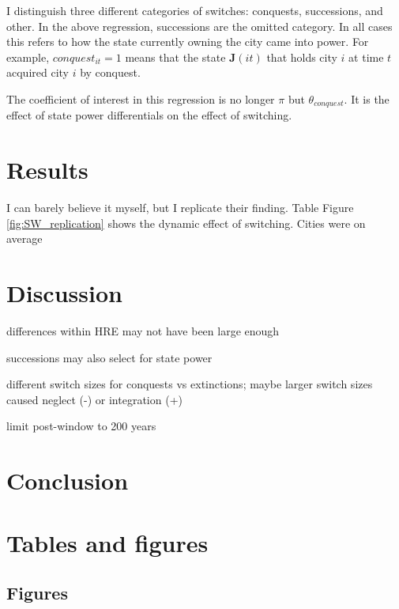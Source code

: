 \documentclass[11pt, a4paper]{article}
\begin{document}
I distinguish three different categories of switches: conquests, successions, and other. In the above regression, successions are the omitted category. In all cases this refers to how the state currently owning the city came into power. For example, $conquest_{it} = 1$ means that the state $\mathbf{J}(it)$ that holds city $i$ at time $t$ acquired city $i$ by conquest.

The coefficient of interest in this regression is no longer $\pi$ but $\theta_{conquest}$. It is the effect of state power differentials on the effect of switching.


\section{Results}

I can barely believe it myself, but I replicate their finding. Table 
Figure \ref{fig:SW_replication} shows the dynamic effect of switching. Cities were on average 




\section{Discussion}

differences within HRE may not have been large enough

successions may also select for state power

different switch sizes for conquests vs extinctions; maybe larger switch sizes caused neglect (-) or integration (+)


limit post-window to 200 years


\section{Conclusion}

\newpage
\onehalfspacing



\newpage
\section*{Tables and figures}

\subsection*{Figures}
\end{document}

